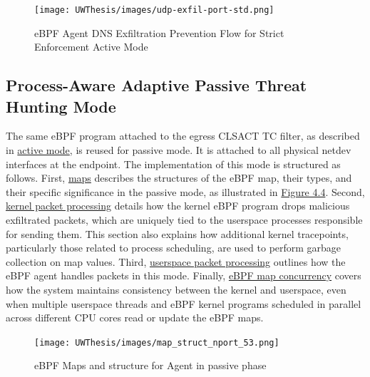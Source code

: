 \documentclass [11pt, proquest] {uwthesis}[2020/02/24]
\begin{document}
\label{sec:data_plane_standard_port}
\begin{figure}[H]
    \texttt{[image: UWThesis/images/udp-exfil-port-std.png]}
\caption{eBPF Agent DNS Exfiltration Prevention Flow for Strict Enforcement Active Mode}
\label{sec:dp-active-phase}
\end{figure}

\subsection{Process-Aware Adaptive Passive Threat Hunting Mode}
\label{sec:passive}
The same eBPF program attached to the egress CLSACT TC filter, as described in \hyperref[sec:active]{active mode}, is reused for passive mode. It is attached to all physical netdev interfaces at the endpoint. The implementation of this mode is structured as follows. First, \hyperref[sec:maps]{maps} describes the structures of the eBPF map, their types, and their specific significance in the passive mode, as illustrated in \hyperref[sec:dp_eBPF_LRU_Maps_passive]{Figure 4.4}. Second, \hyperref[passive:sec1]{kernel packet processing} details how the kernel eBPF program drops malicious exfiltrated packets, which are uniquely tied to the userspace processes responsible for sending them. This section also explains how additional kernel tracepoints, particularly those related to process scheduling, are used to perform garbage collection on map values. Third, \hyperref[passive:sec2]{userspace packet processing} outlines how the eBPF agent handles packets in this mode. Finally, \hyperref[passive:sec3]{eBPF map concurrency} covers how the system maintains consistency between the kernel and userspace, even when multiple userspace threads and eBPF kernel programs scheduled in parallel across different CPU cores read or update the eBPF maps.


\begin{figure}[H]
\centering
\texttt{[image: UWThesis/images/map\_struct\_nport\_53.png]}
\caption{eBPF Maps and structure for Agent in passive phase}
\label{sec:dp_eBPF_LRU_Maps_passive}
\end{figure}
\end{document}
